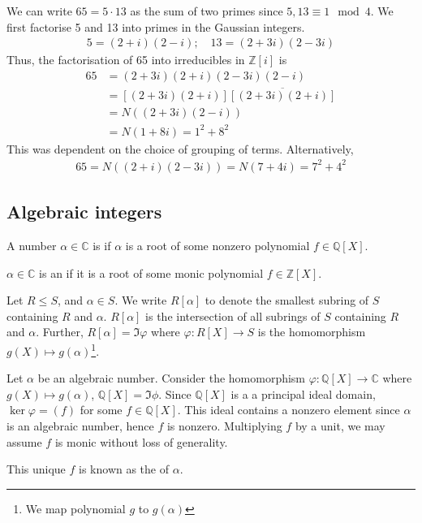 \begin{example}
	We can write $65 = 5 \cdot 13$ as the sum of two primes since $5, 13 \equiv 1 \mod 4$.
	We first factorise 5 and 13 into primes in the Gaussian integers.
	\begin{align*}
		5 = (2+i)(2-i);\quad 13 = (2+3i)(2-3i)
	\end{align*}
	Thus, the factorisation of 65 into irreducibles in $\mathbb Z[i]$ is
	\begin{align*}
		65 & = (2+3i)(2+i)(2-3i)(2-i)                \\
		   & = [(2+3i)(2+i)]\overline{[(2+3i)(2+i)]} \\
		   & = N((2+3i)(2-i))                        \\
		   & = N(1+8i) = 1^2 + 8^2
	\end{align*}
	This was dependent on the choice of grouping of terms.
	Alternatively,
	\begin{align*}
		65 = N((2+i)(2-3i)) = N(7+4i) = 7^2 + 4^2
	\end{align*}
\end{example}

\subsection{Algebraic integers}
\begin{definition}[Algebraic]
	A number $\alpha \in \mathbb C$ is  if $\alpha$ is a root of some nonzero polynomial $f \in \mathbb Q[X]$.
\end{definition}

\begin{definition}
	$\alpha \in \mathbb{C}$ is an  if it is a root of some monic polynomial $f \in \mathbb Z[X]$.
\end{definition} 

\begin{notation}
	Let $R \leq S$, and $\alpha \in S$.
	We write $R[\alpha]$ to denote the smallest subring of $S$ containing $R$ and $\alpha$.
	$R[\alpha]$ is the intersection of all subrings of $S$ containing $R$ and $\alpha$.
	Further, $R[\alpha] = \Im \varphi$ where $\varphi : R[X] \to S$ is the homomorphism $g(X) \mapsto g(\alpha)$\footnote{We map polynomial $g$ to $g(\alpha)$}.
\end{notation} 

\begin{definition}
	Let $\alpha$ be an algebraic number.
	Consider the homomorphism $\varphi : \mathbb Q[X] \to \mathbb C$ where $g(X) \mapsto g(\alpha)$, $\mathbb{Q}[X] = \Im \phi$.
	Since $\mathbb Q[X]$ is a a principal ideal domain, $\ker \varphi = (f)$ for some $f \in \mathbb Q[X]$.
	This ideal contains a nonzero element since $\alpha$ is an algebraic number, hence $f$ is nonzero.
	Multiplying $f$ by a unit, we may assume $f$ is monic without loss of generality.

	This unique $f$ is known as the  of $\alpha$.
\end{definition} 

